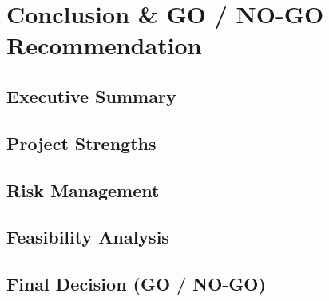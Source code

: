 \chapter{Conclusion \& GO / NO-GO Recommendation}
    \section{Executive Summary}
    \section{Project Strengths}
    \section{Risk Management}
    \section{Feasibility Analysis}
    \section{Final Decision (GO / NO-GO)}

